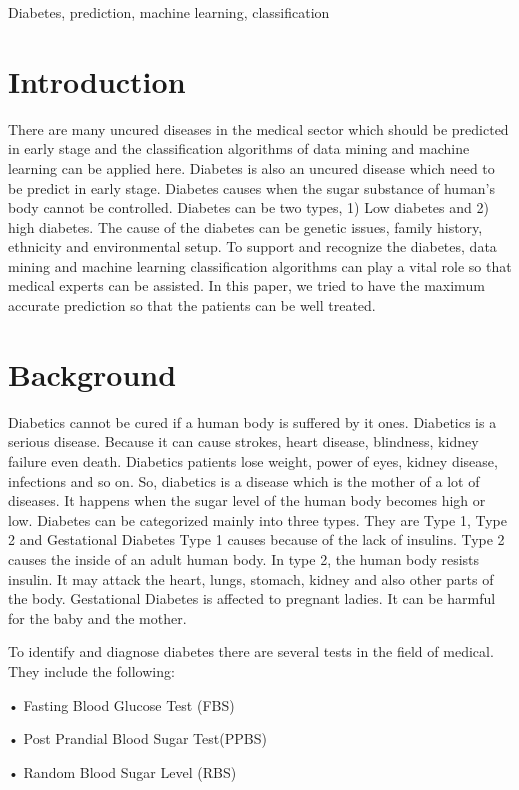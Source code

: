 \documentclass[conference]{IEEEtran}
\begin{document}
\begin{IEEEkeywords}
		Diabetes, prediction, machine learning, classification
\end{IEEEkeywords}
	
\section{Introduction}
	There are many uncured diseases in the medical sector which should be predicted in early stage and the classification algorithms of data mining and machine learning can be applied here. Diabetes is also an uncured disease which need to be predict in early stage. Diabetes causes when the sugar substance of human’s body cannot be controlled. Diabetes can be two types, 1) Low diabetes and 2) high diabetes. The cause of the diabetes can be genetic issues, family history, ethnicity and environmental setup. To support and recognize the diabetes, data mining and machine learning classification algorithms can play a vital role so that medical experts can be assisted. In this paper, we tried to have the maximum accurate prediction so that the patients can be well treated.
	
\section{Background}
	Diabetics cannot be cured if a human body is suffered by it ones. Diabetics is a serious disease. Because it can cause strokes, heart disease, blindness, kidney failure even death. Diabetics patients lose weight, power of eyes, kidney disease, infections and so on. So, diabetics is a disease which is the mother of a lot of diseases. It happens when the sugar level of the human body becomes high or low. Diabetes can be categorized mainly into three types. They are Type 1, Type 2 and Gestational Diabetes Type 1 causes because of the lack of insulins. Type 2 causes the inside of an adult human body. In type 2, the human body resists insulin. It may attack the heart, lungs, stomach, kidney and also other parts of the body. Gestational Diabetes is affected to pregnant ladies. It can be harmful for the baby and the mother.
	
	To identify and diagnose diabetes there are several tests in the field of medical. They include the following:
	
	•	Fasting Blood Glucose Test (FBS)
	
	•	Post Prandial Blood Sugar Test(PPBS)
	
	•	Random Blood Sugar Level (RBS)
	
\end{document}
